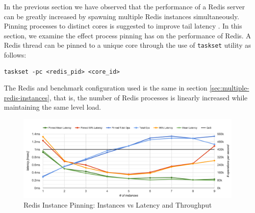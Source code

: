 In the previous section we have observed that the performance of a Redis server can be greatly increased by spawning multiple Redis instances simultaneously. Pinning processes to distinct cores is suggested to improve tail latency \cite{leverich2014reconciling}. In this section, we examine the effect process pinning has on the performance of Redis. A Redis thread can be pinned to a unique core through the use of \texttt{taskset} utility as follows:

\begin{lstlisting}
taskset -pc <redis_pid> <core_id>
\end{lstlisting}

The Redis and benchmark configuration used is the same in section \ref{sec:multiple-redis-instances}, that is, the number of Redis processes is linearly increased while maintaining the same level load.

\begin{figure}[h]
    \includegraphics[width=\textwidth]{./res/6_pinned.png}
    \caption{Redis Instance Pinning: Instances vs Latency and Throughput}
    \label{fig:6_pinned.png}
\end{figure}